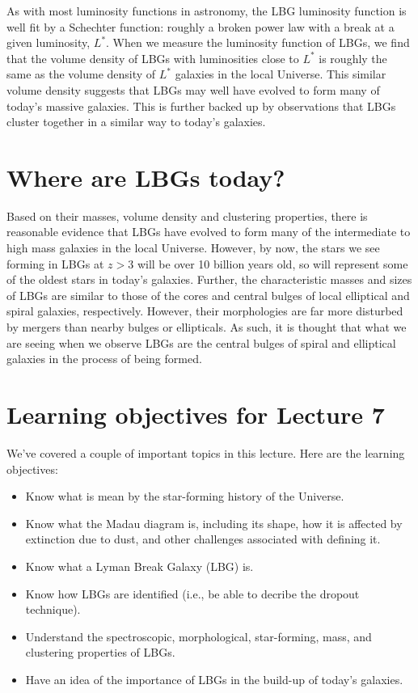 \documentclass[11pt]{article}
\begin{document}
As with most luminosity functions in astronomy, the LBG luminosity
function is well fit by a Schechter function: roughly a broken power
law with a break at a given luminosity, $L^\ast$. When we measure the
luminosity function of LBGs, we find that the volume density of LBGs
with luminosities close to $L^\ast$ is roughly the same as the volume
density of $L^\ast$ galaxies in the local Universe. This similar
volume density suggests that LBGs may well have evolved to form many
of today's massive galaxies. This is further backed up by observations
that LBGs cluster together in a similar way to today's galaxies.

\section{Where are LBGs today?}
Based on their masses, volume density and clustering properties, there
is reasonable evidence that LBGs have evolved to form many of the
intermediate to high mass galaxies in the local Universe. However, by
now, the stars we see forming in LBGs at $z>3$ will be over 10 billion
years old, so will represent some of the oldest stars in today's
galaxies. Further, the characteristic masses and sizes of LBGs are
similar to those of the cores and central bulges of local elliptical
and spiral galaxies, respectively. However, their morphologies are far
more disturbed by mergers than nearby bulges or ellipticals. As such,
it is thought that what we are seeing when we observe LBGs are the
central bulges of spiral and elliptical galaxies in the process of
being formed.

\section{Learning objectives for Lecture 7}
We've covered a couple of important topics in this lecture. Here are
the learning objectives:
\begin{itemize}
\item Know what is mean by the star-forming history of the Universe.
\item Know what the Madau diagram is, including its shape, how it is
  affected by extinction due to dust, and other challenges associated
  with defining it.
\item Know what a Lyman Break Galaxy (LBG) is.
\item Know how LBGs are identified (i.e., be able to decribe the
  dropout technique).
\item Understand the spectroscopic, morphological, star-forming, mass, and
  clustering properties of LBGs.  
\item Have an idea of the importance of LBGs in the build-up of today's galaxies.
\end{itemize}
\end{document}
